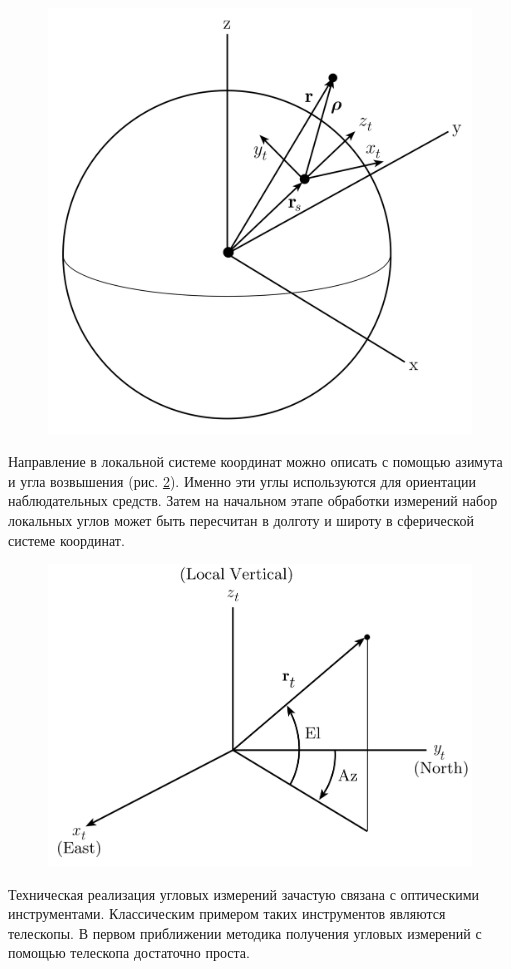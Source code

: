 \begin{figure}[h!]
    \centering
    \includegraphics[width=0.5\linewidth]{../images/review/topo.PNG}
    \label{fig:topo}
\end{figure}

Направление в локальной системе координат можно описать с помощью
азимута и угла возвышения (рис. \ref{fig:enu}).
Именно эти углы используются для ориентации наблюдательных средств.
Затем на начальном этапе обработки измерений набор локальных углов
может быть пересчитан в долготу и широту в сферической системе координат.

\begin{figure}[h!]
    \centering
    \includegraphics[width=0.5\linewidth]{../images/review/enu.PNG}
    \label{fig:enu}
\end{figure}

Техническая реализация угловых измерений зачастую связана с оптическими инструментами. 
Классическим примером таких инструментов являются телескопы. 
В первом приближении методика получения угловых измерений с помощью телескопа достаточно проста.

